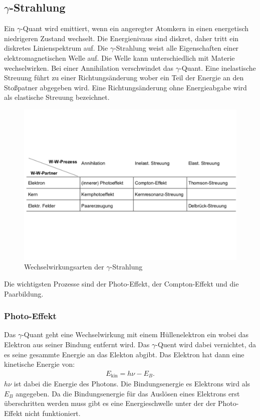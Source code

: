 \subsection{$\gamma$-Strahlung}
Ein $\gamma $-Quant wird emittiert, wenn ein angeregter Atomkern in einen energetisch niedrigeren Zustand wechselt. Die Energienivaus sind diskret, daher tritt ein diskretes Linienspektrum auf. Die $\gamma$-Strahlung weist alle Eigenschaften einer elektromagnetischen Welle auf.
Die Welle kann unterschiedlich mit Materie wechselwirken. Bei einer Annihilation verschwindet das $\gamma$-Quant. Eine inelastische Streuung führt zu einer Richtungsänderung wober ein Teil der Energie an den Stoßpatner abgegeben wird. Eine Richtungsänderung ohne Energieabgabe wird als elastische Streuung bezeichnet.
\begin{figure}[h!]
  \centering
  \includegraphics[width=\textwidth]{tabgamma.pdf}
  \caption{Wechselwirkungsarten der $\gamma$-Strahlung \cite{1}}
  \label{fig:Wgamma}
\end{figure}
Die wichtigsten Prozesse sind der Photo-Effekt, der Compton-Effekt und die Paarbildung.
\FloatBarrier
\subsubsection{Photo-Effekt}
Das $\gamma$-Quant geht eine Wechselwirkung mit einem Hüllenelektron ein wobei das Elektron aus seiner Bindung entfernt wird. Das $\gamma$-Quent wird dabei vernichtet, da es seine gesammte Energie an das Elekton abgibt.
Das Elektron hat dann eine kinetische Energie von:
\begin{align*}
  E_{\text{kin}}=h\nu-E_B.
\end{align*}
$h\nu$ ist dabei die Energie des Photons. Die Bindungsenergie es Elektrons wird als $E_B$ angegeben.
Da die Bindungsenergie für das Auslösen eines Elektrons erst überschritten werden muss gibt es eine Energieschwelle unter der der Photo-Effekt nicht funktioniert.
